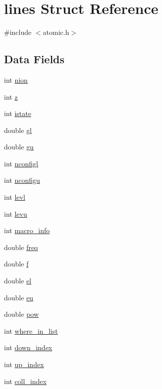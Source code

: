 \hypertarget{structlines}{}\section{lines Struct Reference}
\label{structlines}


{\ttfamily \#include $<$atomic.\+h$>$}

\subsection*{Data Fields}
\begin{DoxyCompactItemize}
\item 
int \hyperlink{structlines_a041ae338e41bad14998557cbd42443fc}{nion}
\item 
int \hyperlink{structlines_aef3b1049087e120d1cc1436ac78c62f6}{z}
\item 
int \hyperlink{structlines_a5c97542291f487068cbb200bd31b210e}{istate}
\item 
double \hyperlink{structlines_a5165d0546a6f5fa57612a4476d2b5ab9}{gl}
\item 
double \hyperlink{structlines_a0e2eb51cd04b7d4bbc112e63d1744a9f}{gu}
\item 
int \hyperlink{structlines_aa570454ab15c3c7d4324b54a254daf05}{nconfigl}
\item 
int \hyperlink{structlines_a96fff3bddbfd451e708fe60b9b495784}{nconfigu}
\item 
int \hyperlink{structlines_a9155121a84e08bc8bbc58e6b9f50d75b}{levl}
\item 
int \hyperlink{structlines_a035daaa803e672f4242120f04f91eb46}{levu}
\item 
int \hyperlink{structlines_a8bf1b13f22b24fc4fb517bb28dd775b8}{macro\+\_\+info}
\item 
double \hyperlink{structlines_a4d74840df54d02617c21c66b2498a81c}{freq}
\item 
double \hyperlink{structlines_adda9b685ebb8bc0dd55faea92c24f3ca}{f}
\item 
double \hyperlink{structlines_ae043cb5d7f06d4fc481c15c5a2273257}{el}
\item 
double \hyperlink{structlines_acd7e99d636aefd7eb8868398ab09b8a9}{eu}
\item 
double \hyperlink{structlines_a3a0d7a9e793ec94dea8247160927062d}{pow}
\item 
int \hyperlink{structlines_a21eb2458dc558a817e715ca184cf8bb5}{where\+\_\+in\+\_\+list}
\item 
int \hyperlink{structlines_aedc43927b63718153801e7fbe95773d5}{down\+\_\+index}
\item 
int \hyperlink{structlines_aba84d0d3fbc46d274bba8235e5758806}{up\+\_\+index}
\item 
int \hyperlink{structlines_ae559930552d0a0d053b3e51262ac7984}{coll\+\_\+index}
\end{DoxyCompactItemize}


